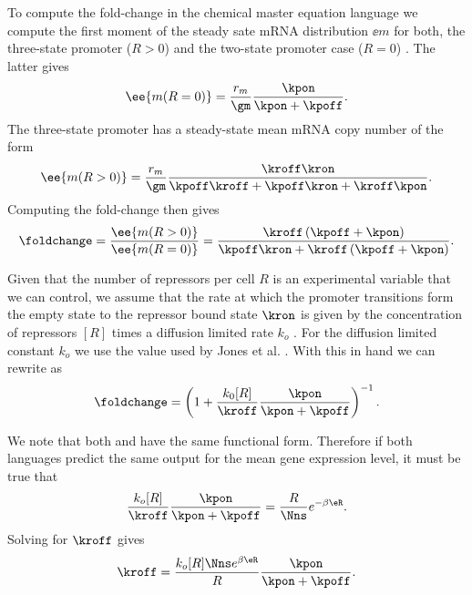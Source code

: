 To compute the fold-change in the chemical master equation language we compute
the first moment of the steady sate mRNA distribution $\ee{m}$ for both, the
three-state promoter ($R>0$) and the two-state promoter case ($R=0$)
. The latter gives
\begin{equation}
  \ee{m (R = 0)} = {r_m \over \gm} {\kpon \over \kpon + \kpoff}.
\end{equation}
The three-state promoter has a steady-state mean mRNA copy number of the form
\begin{equation}
  \ee{m (R > 0)} = {r_m \over \gm} {\kroff\kron
  \over \kpoff\kroff + \kpoff\kron + \kroff\kpon}.
\end{equation}
Computing the fold-change then gives
\begin{equation}
  \foldchange = {\ee{m (R > 0)} \over \ee{m (R = 0)}} =
  {\kroff \left( \kpoff + \kpon \right) \over
  \kpoff\kron + \kroff \left( \kpoff + \kpon \right)}.
  \label{seq_fold_change_cme}
\end{equation}

Given that the number of repressors per cell $R$ is an experimental variable
that we can control, we assume that the rate at which the promoter transitions
form the empty state to the repressor bound state $\kron$ is given by the
concentration of repressors $[R]$ times a diffusion limited rate $k_o$
\cite{Jones2014a}.  For the diffusion limited constant $k_o$ we use the value
used by Jones et al. \cite{Jones2014a} . With this in hand we can rewrite
 as
\begin{equation}
  \foldchange = \left( 1 + {k_0 [R] \over \kroff}
                {\kpon \over \kpon + \kpoff} \right)^{-1}.
  \label{seq_fc_kinetic}
\end{equation}

We note that both  and  have the same
functional form. Therefore if both languages predict the same output for the
mean gene expression level, it must be true that
\begin{equation}
  {k_o [R] \over \kroff}{\kpon \over \kpon + \kpoff} =
  {R \over \Nns} e^{-\beta\eR}.
\end{equation}
Solving for $\kroff$ gives
\begin{equation}
  \kroff = {k_o [R] \Nns e^{\beta\eR} \over R}{\kpon \over \kpon + \kpoff}.
  \label{seq_kroff_complete}
\end{equation}

